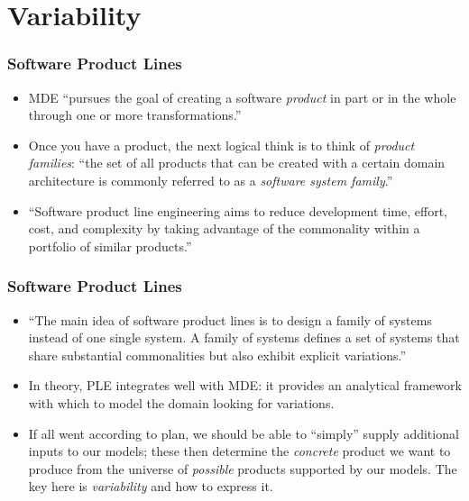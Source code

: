 \documentclass{beamer}
\begin{document}
\section{Variability}

\begin{frame}
\frametitle{Software Product Lines}

\begin{itemize}

\item \ac{MDE} ``pursues the goal of creating a software
  \emph{product} in part or in the whole through one or more
  transformations.''\cite{volter2013model}

\pause

\item Once you have a product, the next logical think is to think of
  \emph{product families}: ``the set of all products that can be
  created with a certain domain architecture is commonly referred to
  as a \emph{software system family}.''\cite{volter2013model}

\pause

\item ``Software product line engineering aims to reduce development
  time, effort, cost, and complexity by taking advantage of the
  commonality within a portfolio of similar
  products.''\cite{voelter2007handling}

\end{itemize}

\end{frame}

\begin{frame}
\frametitle{Software Product Lines}

\begin{itemize}

\item ``The main idea of software product lines is to design a family
  of systems instead of one single system. A family of systems defines
  a set of systems that share substantial commonalities but also
  exhibit explicit variations.''\cite{brambilla2012model}

\pause

\item In theory, \ac{PLE} integrates well with \ac{MDE}: it provides
  an analytical framework with which to model the domain looking for
  variations.

\pause

\item If all went according to plan, we should be able to ``simply''
  supply additional inputs to our models; these then determine the
  \emph{concrete} product we want to produce from the universe of
  \emph{possible} products supported by our models. The key here is
  \emph{variability} and how to express it.

\end{itemize}

\end{frame}
\end{document}
